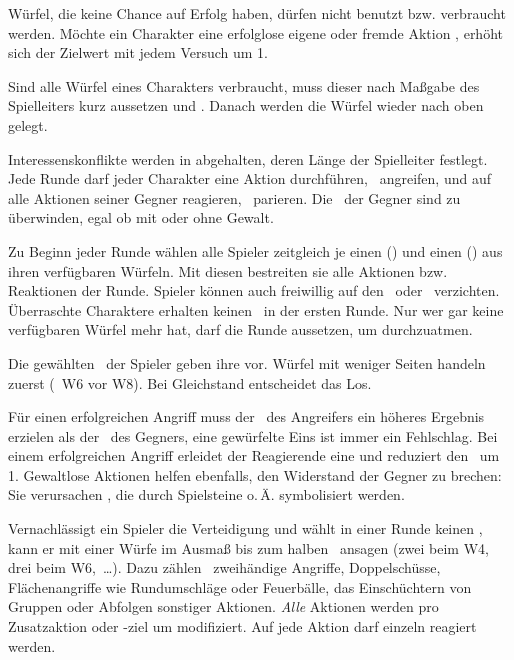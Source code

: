 {		Würfel, die keine Chance auf Erfolg haben, dürfen nicht benutzt bzw. verbraucht werden. Möchte ein Charakter eine erfolglose eigene oder fremde Aktion , erhöht sich der Zielwert mit jedem Versuch um 1.

		Sind alle Würfel eines Charakters verbraucht, muss dieser nach Maßgabe des Spielleiters kurz aussetzen und . Danach werden die Würfel wieder nach oben gelegt.


		\noindent
		Interessenskonflikte werden in  abgehalten, deren Länge der Spielleiter festlegt. Jede Runde darf jeder Charakter eine Aktion durchführen, \zB\ angreifen, und auf alle Aktionen seiner Gegner reagieren, \zB\ parieren. Die \HD\ der Gegner sind zu überwinden, egal ob mit oder ohne Gewalt.

		Zu Beginn jeder Runde wählen alle Spieler zeitgleich je einen  (\AD) und einen  (\RD) aus ihren verfügbaren Würfeln. Mit diesen bestreiten sie alle Aktionen bzw. Reaktionen der Runde. Spieler können auch freiwillig auf den \AD\ oder \RD\ verzichten. Überraschte Charaktere erhalten keinen \AD\ in der ersten Runde. Nur wer gar keine verfügbaren Würfel mehr hat, darf die Runde aussetzen, um durchzuatmen.

		Die gewählten \AD\ der Spieler geben ihre  vor. Würfel mit weniger Seiten handeln zuerst (\zB\ W6 vor W8). Bei Gleichstand entscheidet das Los.

		Für einen erfolgreichen Angriff muss der \AD\ des Angreifers ein höheres Ergebnis erzielen als der \RD\ des Gegners, eine gewürfelte Eins ist immer ein Fehlschlag. Bei einem erfolgreichen Angriff erleidet der Reagierende eine  und reduziert den \HD\ um 1. Gewaltlose Aktionen helfen ebenfalls, den Widerstand der Gegner zu brechen: Sie verursachen , die durch Spielsteine o.\,Ä. symbolisiert werden.

		Vernachlässigt ein Spieler die Verteidigung und wählt in einer Runde keinen \RD, kann er mit einer  Würfe im Ausmaß bis zum halben \AD\ ansagen (zwei beim W4, drei beim W6,~\ldots). Dazu zählen \zB\ zweihändige Angriffe, Doppelschüsse, Flächenangriffe wie Rundumschläge oder Feuerbälle, das Einschüchtern von Gruppen oder Abfolgen sonstiger Aktionen. \emph{Alle} Aktionen werden pro Zusatzaktion oder -ziel um  modifiziert. Auf jede Aktion darf einzeln reagiert werden.

}

